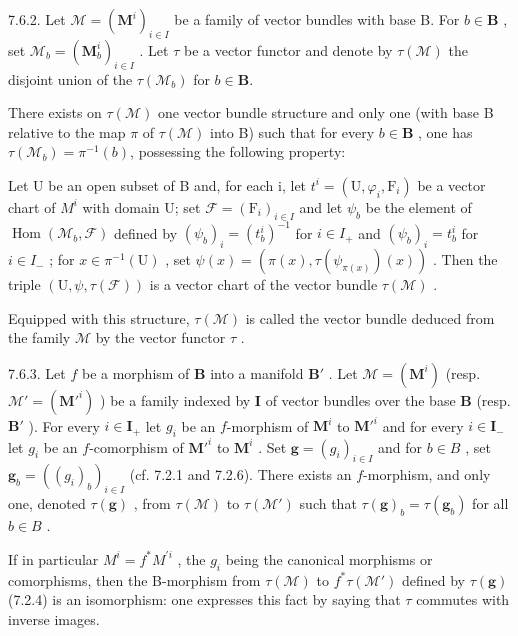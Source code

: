 7.6.2. Let \(\mathcal{M} = (\mathbf{M}^i)_{i\in I}\) be a family of vector bundles with base B. For \(b\in \mathbf{B}\) , set \(\mathcal{M}_b = (\mathbf{M}_b^i)_{i\in I}\) . Let \(\tau\) be a vector functor and denote by \(\tau (\mathcal{M})\) the disjoint union of the \(\tau(\mathcal{M}_{b})\) for \(b\in\mathbf{B}\).

There exists on \(\tau(\mathcal{M})\) one vector bundle structure and only one (with base B relative to the map \(\pi\) of \(\tau(\mathcal{M})\) into B) such that for every \(b\in\mathbf{B}\) , one has \(\tau(\mathcal{M}_{b})=\pi^{-1}(b)\), possessing the following property:

Let U be an open subset of B and, for each i, let \(t^{i} = (\mathrm{U}, \varphi_{i}, \mathrm{F}_{i})\) be a vector chart of \(M^{i}\) with domain U; set \(\mathcal{F} = (\mathrm{F}_{i})_{i \in I}\) and let \(\psi_{b}\) be the element of \(\operatorname{Hom}(\mathcal{M}_{b}, \mathcal{F})\) defined by \((\psi_{b})_{i} = (t_{b}^{i})^{-1}\) for \(i \in I_{+}\) and \((\psi_{b})_{i} = t_{b}^{i}\) for \(i \in I_{-}\) ; for \(x \in \pi^{-1}(\mathrm{U})\) , set \(\psi(x) = (\pi(x), \tau(\psi_{\pi(x)})(x))\) . Then the triple \((\mathrm{U}, \psi, \tau(\mathcal{F}))\) is a vector chart of the vector bundle \(\tau(\mathcal{M})\) .

Equipped with this structure, \(\tau(\mathcal{M})\) is called the vector bundle deduced from the family \(\mathcal{M}\) by the vector functor \(\tau\) .

7.6.3. Let \(f\) be a morphism of \(\mathbf{B}\) into a manifold \(\mathbf{B}'\) . Let \(\mathcal{M} = (\mathbf{M}^i)\) (resp. \(\mathcal{M}' = (\mathbf{M}'^i)\) ) be a family indexed by \(\mathbf{I}\) of vector bundles over the base \(\mathbf{B}\) (resp. \(\mathbf{B}'\) ). For every \(i \in \mathbf{I}_+\) let \(g_i\) be an \(f\)-morphism of \(\mathbf{M}^i\) to \(\mathbf{M}'^i\) and for every \(i \in \mathbf{I}_-\) let \(g_i\) be an \(f\)-comorphism of \(\mathbf{M}'^i\) to \(\mathbf{M}^i\) . Set \(\mathbf{g} = (g_i)_{i \in I}\) and for \(b \in B\) , set \(\mathbf{g}_b = ((g_i)_b)_{i \in I}\) (cf. 7.2.1 and 7.2.6). There exists an \(f\)-morphism, and only one, denoted \(\tau(\mathbf{g})\) , from \(\tau(\mathcal{M})\) to \(\tau(\mathcal{M}')\) such that \(\tau(\mathbf{g})_b = \tau(\mathbf{g}_b)\) for all \(b \in B\) .

If in particular \(M^{i}=f^{*}M^{'i}\) , the \(g_{i}\) being the canonical morphisms or comorphisms, then the B-morphism from \(\tau(\mathcal{M})\) to \(f^{*}\tau(\mathcal{M}')\) defined by \(\tau(\mathbf{g})\) (7.2.4) is an isomorphism: one expresses this fact by saying that \(\tau\) commutes with inverse images.

